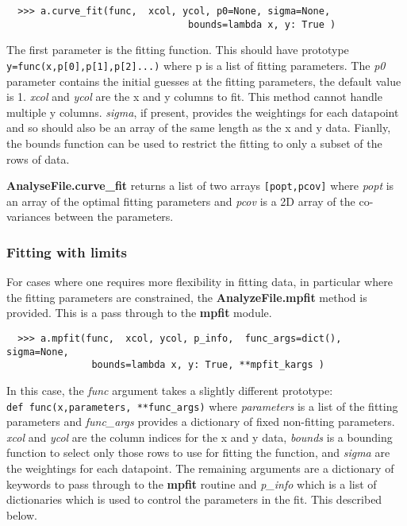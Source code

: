 \documentclass[a4paper,11pt]{scrartcl}
\begin{document}
\begin{verbatim}
  >>> a.curve_fit(func,  xcol, ycol, p0=None, sigma=None,
                                bounds=lambda x, y: True )
\end{verbatim}

The first parameter is the fitting function. This should have prototype
\\\verb:y=func(x,p[0],p[1],p[2]...): where p is a list of fitting parameters.
The \textit{p0} parameter contains the initial guesses at the fitting
parameters, the default value is 1. \textit{xcol} and \textit{ycol} are the x
and y columns to fit. This method cannot handle multiple y columns.
\textit{sigma}, if present, provides the weightings for each datapoint and so
should also be an array of the same length as the x and y data. Fianlly, the
bounds function can be used to restrict the fitting to only a subset of the rows
of data.

\textbf{AnalyseFile.curve\_fit} returns a list of two arrays \verb:[popt,pcov]:
where \textit{popt} is an array of the optimal fitting parameters and
\textit{pcov} is a 2D array of the co-variances between the parameters.

\subsubsection{Fitting with limits}

For cases where one requires more flexibility in fitting data, in particular
where the fitting parameters are constrained, the \textbf{AnalyzeFile.mpfit}
method is provided. This is a pass through to the \textbf{mpfit} module.

\begin{verbatim}
  >>> a.mpfit(func,  xcol, ycol, p_info,  func_args=dict(), sigma=None,
               bounds=lambda x, y: True, **mpfit_kargs )
\end{verbatim}

In this case, the \textit{func} argument takes a slightly different
prototype:\\\verb:def func(x,parameters, **func_args): where \textit{parameters}
is a list of the fitting parameters and \textit{func\_args} provides a
dictionary of fixed \ie non-fitting parameters. \textit{xcol} and \textit{ycol}
are the column indices for the x and y data, \textit{bounds} is a bounding
function to select only those rows to use for fitting the function, and
\textit{sigma} are the weightings for each datapoint. The remaining arguments
are a dictionary of keywords to pass through to the \textbf{mpfit} routine and
\textit{p\_info} which is a list of dictionaries which is used to control the
parameters in the fit. This described below.
\end{document}
